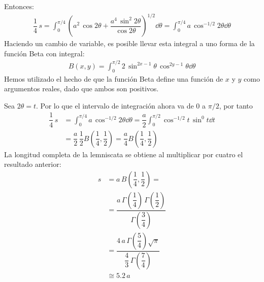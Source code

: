 Entonces:
\begin{align*}
\dfrac{1}{4} \, s = \int_{0}^{\pi/4} \left( a^{2} \, \cos 2 \theta + \dfrac{a^{4} \, \sin^{2} 2 \theta}{\cos 2 \theta} \right)^{1/2} \dd{\theta} = \int_{0}^{\pi/4} a \, \cos^{-1/2} 2 \theta \dd{\theta}
\end{align*}
Haciendo un cambio de variable, es posible llevar esta integral a uno forma de la función Beta con integral:
\begin{align*}
B(x, y) = \int_{0}^{\pi/2} 2 \, \sin^{2x-1} \theta \, \cos^{2y-1} \theta \dd{\theta}
\end{align*}
Hemos utilizado el hecho de que la función Beta define una función de $x$ y $y$ como argumentos reales, dado que ambos son positivos.
\par
Sea $2 \theta = t$. Por lo que el intervalo de integración ahora va de $0$ a $\pi/2$, por tanto
\begin{align*}
\dfrac{1}{4} \, s &= \int_{0}^{\pi/4} a \, \cos^{-1/2} 2 \theta \dd{\theta} = \dfrac{a}{2} \int_{0}^{\pi/2} \cos^{-1/2} t \, \sin^{0} t \dd{t} \\[1em]
&= \dfrac{a}{2} \, \dfrac{1}{2} B\left(\dfrac{1}{4}, \dfrac{1}{2} \right) = \dfrac{a}{4} B\left(\dfrac{1}{4}, \dfrac{1}{2} \right)
\end{align*}
La longitud completa de la lemniscata se obtiene al multiplicar por cuatro el resultado anterior:
\begin{align*}
s &= a \, B\left(\dfrac{1}{4}, \dfrac{1}{2} \right) = \\
&= \dfrac{a \, \Gamma \left( \dfrac{1}{4} \right) \, \Gamma \left( \dfrac{1}{2} \right) }{\Gamma \left( \dfrac{3}{4} \right)} \\
&= \dfrac{4 \, a \, \Gamma \left( \dfrac{5}{4} \right) \sqrt{\pi}}{\dfrac{4}{3} \, \Gamma \left( \dfrac{7}{4} \right)} \\
&\cong 5.2 \,a
\end{align*}
